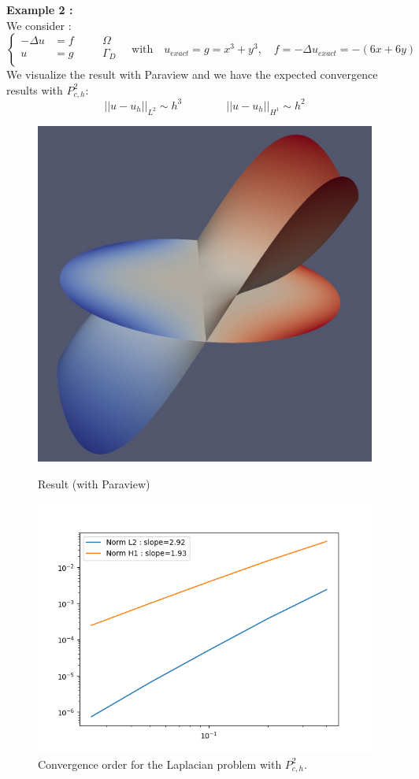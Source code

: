 \noindent\textbf{Example 2 :} \\
We consider :
$$\left\{\begin{aligned}
	-\Delta u &= f \quad&&\Omega \\
	u&=g \quad&&\Gamma_D \\
\end{aligned}\right. \quad \text{with} \quad
u_{exact}=g=x^3+y^3, \quad f=-\Delta u_{exact}=-(6x+6y)$$
\noindent We visualize the result with Paraview and we have the expected convergence results  with $P_{c,h}^2$:
$$||u-u_h||_{L^2}\sim h^3 \qquad \qquad ||u-u_h||_{H^1}\sim h^2$$
\begin{figure}[H]
	\begin{minipage}{0.48\linewidth}
		\centering
		\includegraphics[width=0.7\linewidth]{"images/parareal/feelpp/circle_result_2.jpg"}
		\caption{Result (with Paraview)}
	\end{minipage}
	\begin{minipage}{0.48\linewidth}
		\centering\includegraphics[width=0.9\linewidth]{"images/parareal/feelpp/cvg_laplacian_k2_o3.png"}
		\caption{Convergence order for the Laplacian problem with $P_{c,h}^2$.}
	\end{minipage}
\end{figure}

